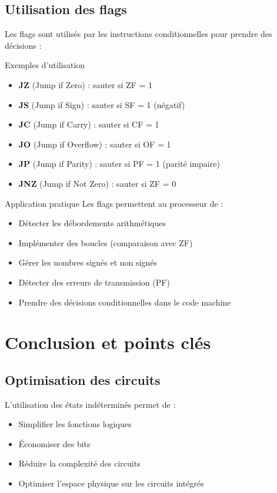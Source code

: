 \documentclass[a4paper,12pt]{article}
\begin{document}
\subsection{Utilisation des flags}

Les flags sont utilisés par les instructions conditionnelles pour prendre des décisions :

\begin{examplebox}{Exemples d'utilisation}
\begin{itemize}
    \item \textbf{JZ} (Jump if Zero) : sauter si ZF = 1
    \item \textbf{JS} (Jump if Sign) : sauter si SF = 1 (négatif)
    \item \textbf{JC} (Jump if Carry) : sauter si CF = 1
    \item \textbf{JO} (Jump if Overflow) : sauter si OF = 1
    \item \textbf{JP} (Jump if Parity) : sauter si PF = 1 (parité impaire)
    \item \textbf{JNZ} (Jump if Not Zero) : sauter si ZF = 0
\end{itemize}
\end{examplebox}

\begin{remarkbox}{Application pratique}
Les flags permettent au processeur de :
\begin{itemize}
    \item Détecter les débordements arithmétiques
    \item Implémenter des boucles (comparaison avec ZF)
    \item Gérer les nombres signés et non signés
    \item Détecter des erreurs de transmission (PF)
    \item Prendre des décisions conditionnelles dans le code machine
\end{itemize}
\end{remarkbox}

\newpage
\section{Conclusion et points clés}

\subsection{Optimisation des circuits}

L'utilisation des états indéterminés permet de :
\begin{itemize}
    \item Simplifier les fonctions logiques
    \item Économiser des bits
    \item Réduire la complexité des circuits
    \item Optimiser l'espace physique sur les circuits intégrés
\end{itemize}
\end{document}
